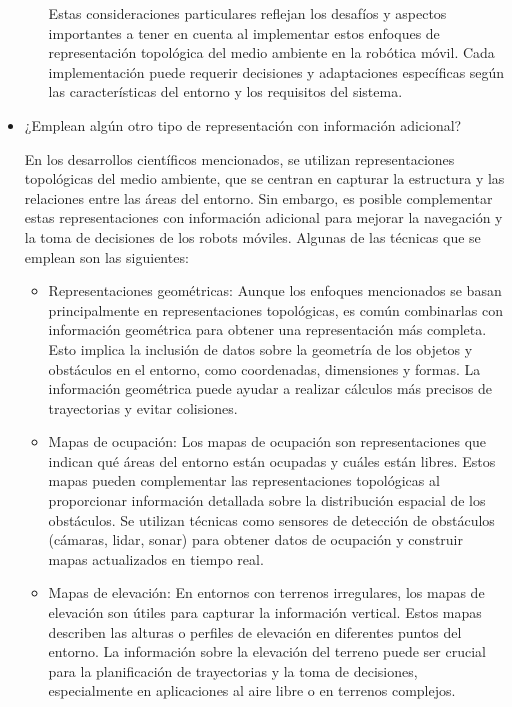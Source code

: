 \documentclass{article}
\begin{document}
\begin{itemize}
\begin{enumerate}
    Estas consideraciones particulares reflejan los desafíos y aspectos importantes a tener en cuenta al implementar estos enfoques de representación topológica del medio ambiente en la robótica móvil. Cada implementación puede requerir decisiones y adaptaciones específicas según las características del entorno y los requisitos del sistema.
    
  \end{enumerate}
  
\item {¿Emplean algún otro tipo de representación con información adicional?}

  En los desarrollos científicos mencionados, se utilizan representaciones topológicas del medio ambiente, que se centran en capturar la estructura y las relaciones entre las áreas del entorno. Sin embargo, es posible complementar estas representaciones con información adicional para mejorar la navegación y la toma de decisiones de los robots móviles. Algunas de las técnicas que se emplean son las siguientes:

  \begin{itemize}
\item Representaciones geométricas: Aunque los enfoques mencionados se basan principalmente en representaciones topológicas, es común combinarlas con información geométrica para obtener una representación más completa. Esto implica la inclusión de datos sobre la geometría de los objetos y obstáculos en el entorno, como coordenadas, dimensiones y formas. La información geométrica puede ayudar a realizar cálculos más precisos de trayectorias y evitar colisiones.
\item Mapas de ocupación: Los mapas de ocupación son representaciones que indican qué áreas del entorno están ocupadas y cuáles están libres. Estos mapas pueden complementar las representaciones topológicas al proporcionar información detallada sobre la distribución espacial de los obstáculos. Se utilizan técnicas como sensores de detección de obstáculos (cámaras, lidar, sonar) para obtener datos de ocupación y construir mapas actualizados en tiempo real.
  \item Mapas de elevación: En entornos con terrenos irregulares, los mapas de elevación son útiles para capturar la información vertical. Estos mapas describen las alturas o perfiles de elevación en diferentes puntos del entorno. La información sobre la elevación del terreno puede ser crucial para la planificación de trayectorias y la toma de decisiones, especialmente en aplicaciones al aire libre o en terrenos complejos.


\end{itemize}
\end{itemize}
\end{document}
